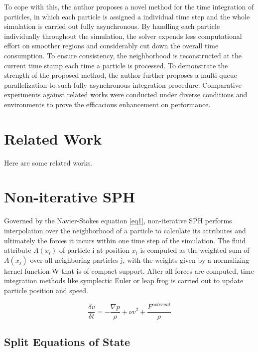 \documentclass[
	11pt, 
	DIV10,
	ngerman,
	a4paper, 
	oneside, 
	headings=normal, 
	captions=tableheading,
	final, 
	numbers=noenddot
]{scrartcl}
\begin{document}
\par
To cope with this, the author proposes a novel method for the time integration of particles, in which each particle is assigned a individual time step and the whole simulation is carried out fully asynchronous. By handling each particle
individually throughout the simulation, the solver expends less computational effort on smoother regions and considerably cut down the overall time consumption. To ensure consistency, the neighborhood is reconstructed at the current time stamp each time a particle is processed. To demonstrate the strength of the proposed method, the author further proposes a multi-queue parallelization to such fully asynchronous integration procedure. Comparative experiments against related works were conducted under diverse conditions and environments to prove the efficacious enhancement on performance.

\section{Related Work}

Here are some related works.

\section{Non-iterative SPH}

Governed by the Navier-Stokes equation \ref{eq1}, non-iterative SPH performs interpolation over the neighborhood of a particle to calculate its attributes and ultimately the forces it incurs within one time step of the simulation. The fluid attribute $ A(x_{i}) $ of particle i at position $ x_{i} $ is computed as the weighted sum of  $ A(x_{j}) $ over all neighboring particles j, with the weights given by a normalizing kernel function W that is of compact support. After all forces are computed, time integration methods like symplectic Euler or leap frog is carried out to update particle position and speed.

\begin{equation}
	\label{eq1}
	\frac{\delta v}{\delta t} = -\frac{\nabla p}{\rho} + \nu v^{2} + \frac{F^{external}}{\rho}
\end{equation}

\subsection{Split Equations of State}
\end{document}
